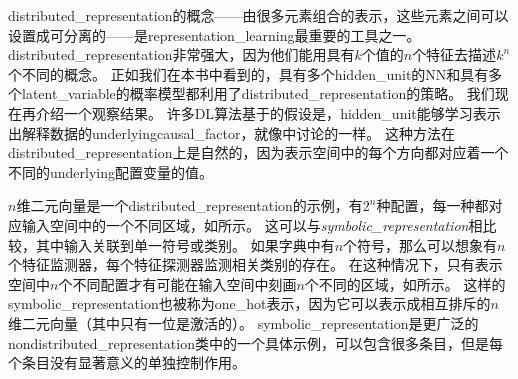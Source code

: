 \gls{distributed_representation}的概念——由很多元素组合的表示，这些元素之间可以设置成可分离的——是\gls{representation_learning}最重要的工具之一。
\gls{distributed_representation}非常强大，因为他们能用具有$k$个值的$n$个特征去描述$k^n$个不同的概念。
正如我们在本书中看到的，具有多个\gls{hidden_unit}的\gls{NN}和具有多个\gls{latent_variable}的概率模型都利用了\gls{distributed_representation}的策略。
我们现在再介绍一个观察结果。
许多\gls{DL}算法基于的假设是，\gls{hidden_unit}能够学习表示出解释数据的\gls{underlying}\gls{causal_factor}，就像中讨论的一样。
这种方法在\gls{distributed_representation}上是自然的，因为表示空间中的每个方向都对应着一个不同的\gls{underlying}配置变量的值。


$n$维二元向量是一个\gls{distributed_representation}的示例，有$2^n$种配置，每一种都对应输入空间中的一个不同区域，如所示。
这可以与\emph{\gls{symbolic_representation}}相比较，其中输入关联到单一符号或类别。
如果字典中有$n$个符号，那么可以想象有$n$个特征监测器，每个特征探测器监测相关类别的存在。
在这种情况下，只有表示空间中$n$个不同配置才有可能在输入空间中刻画$n$个不同的区域，如所示。
这样的\gls{symbolic_representation}也被称为\gls{one_hot}表示，因为它可以表示成相互排斥的$n$维二元向量（其中只有一位是激活的）。
\gls{symbolic_representation}是更广泛的\gls{nondistributed_representation}类中的一个具体示例，可以包含很多条目，但是每个条目没有显著意义的单独控制作用。


